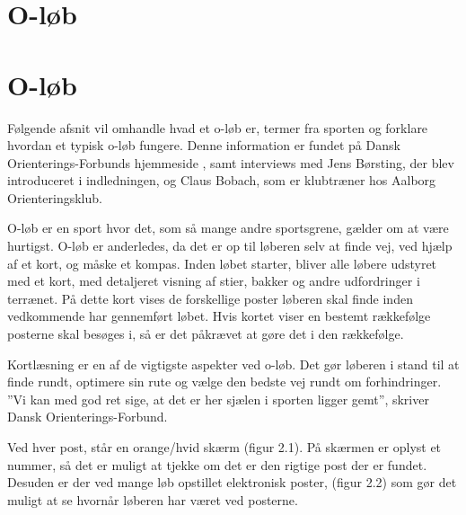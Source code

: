 \section{O-løb}
\section{O-løb}
Følgende afsnit vil omhandle hvad et o-løb er, termer fra sporten og forklare hvordan et typisk o-løb fungere. Denne information er fundet på Dansk Orienterings-Forbunds hjemmeside \citep{DOF}, samt interviews med Jens Børsting, der blev introduceret i indledningen, og Claus Bobach, som er klubtræner hos Aalborg Orienteringsklub.

O-løb er en sport hvor det, som så mange andre sportsgrene, gælder om at være hurtigst. O-løb er anderledes, da det er op til løberen selv at finde vej, ved hjælp af et kort, og måske et kompas. Inden løbet starter, bliver alle løbere udstyret med et kort, med detaljeret visning af stier, bakker og andre udfordringer i terrænet. På dette kort vises de forskellige poster løberen skal finde inden vedkommende har gennemført løbet. Hvis kortet viser en bestemt rækkefølge posterne skal besøges i, så er det påkrævet at gøre det i den rækkefølge. 

Kortlæsning er en af de vigtigste aspekter ved o-løb. Det gør løberen i stand til at finde rundt, optimere sin rute og vælge den bedste vej rundt om forhindringer. ”Vi kan med god ret sige, at det er her sjælen i sporten ligger gemt”, skriver Dansk Orienterings-Forbund.   

Ved hver post, står en orange/hvid skærm (figur 2.1). På skærmen er oplyst et nummer, så det er muligt at tjekke om det er den rigtige post der er fundet. Desuden er der ved mange løb opstillet elektronisk poster, (figur 2.2) som gør det muligt at se hvornår løberen har været ved posterne.

